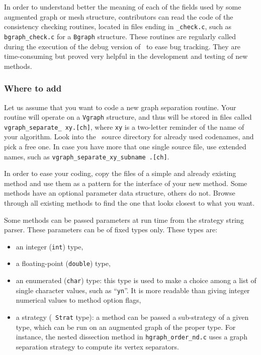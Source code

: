 In order to understand better the meaning of each of the fields
used by some augmented graph or mesh structure, contributors can read
the code of the consistency checking routines, located in files ending
in \texttt{\_check.c}\enspace, such as \texttt{bgraph\_check.c} for a
\texttt{Bgraph} structure. These routines are regularly called during the
execution of the debug version of \scotch\ to ease bug tracking. They
are time-consuming but proved very helpful in the development and
testing of new methods.

\subsubsection{Where to add}

Let us assume that you want to code a new graph separation
routine. Your routine will operate on a \texttt{Vgraph} structure, and
thus will be stored in files called \texttt{vgraph\_\lbt separate\_
xy\lbt .[ch]}, where \texttt{xy} is a two-letter reminder of the name
of your algorithm. Look into the \libscotch\ source directory for
already used codenames, and pick a free one.
In case you have more that one single source file, use extended names,
such as \texttt{vgraph\_\lbt separate\_\lbt xy\_\lbt subname\lbt
.[ch]}\enspace .

In order to ease your coding, copy the files of a simple and already
existing method and use them as a pattern for the interface of your
new method. Some methods have an optional parameter data structure,
others do not. Browse through all existing methods to find the one
that looks closest to what you want.

Some methods can be passed parameters at run time from the strategy
string parser. These parameters can be of fixed types only. These
types are:
\begin{itemize}
\item
an integer (\texttt{int}) type,
\item
a floating-point (\texttt{double}) type,
\item
an enumerated (\texttt{char}) type: this type is used to make a
choice among a list of single character values, such as
``\texttt{yn}''. It is more readable than giving integer numerical
values to method option flags,
\item
a strategy (\scotch\ \texttt{Strat} type): a method can be passed a
sub-strategy of a given type, which can be run on an augmented graph
of the proper type. For instance, the nested dissection method in
\texttt{hgraph\_\lbt order\_\lbt nd\lbt .c} uses a graph separation
strategy to compute its vertex separators.
\end{itemize}

